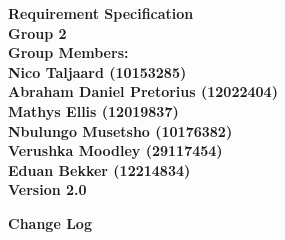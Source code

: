 \documentclass[12pt]{article}
\newcommand{\Title}{Requirement Specification} %
\begin{document}
	\vspace{4em}
	
	\begin{center}%
	
	  \LARGE \bf \Title \\[4em]
	  \LARGE {\bf Group 2}\\[1em]
	  \LARGE {\bf Group Members:}\\[2em]
	  \large
	     Nico Taljaard					(10153285) \\[1em]
	     Abraham Daniel Pretorius		(12022404) \\[1em]
	     Mathys Ellis					(12019837) \\[1em]
	     Nbulungo Musetsho				(10176382) \\[1em]
	     Verushka Moodley				(29117454) \\[1em]
	     Eduan Bekker					(12214834) \\[8em]
	     {\bf Version 2.0}
	    
	\end{center}%
	
	\newpage
		{\LARGE \bf Change Log}\\[2em]
		
\end{document}
